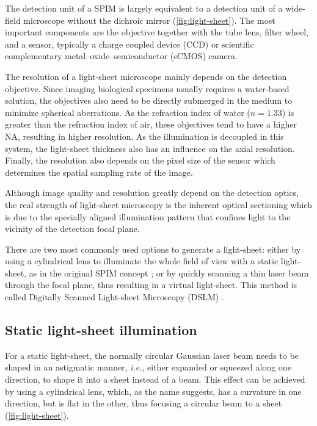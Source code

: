     The detection unit of a SPIM is largely equivalent to a detection unit of a wide-field microscope without the dichroic mirror (\autoref{fig:light-sheet}). The most important components are the objective together with the tube lens, filter wheel, and a sensor, typically a charge coupled device (CCD) or scientific complementary metal–oxide–semiconductor (sCMOS) camera.
    
    The resolution of a light-sheet microscope mainly depends on the detection objective.
    Since imaging biological specimens usually requires a water-based solution, the objectives also need to be directly submerged in the medium to minimize spherical aberrations. As the refraction index of water ($n=1.33$) is greater than the refraction index of air, these objectives tend to have a higher NA, resulting in higher resolution. As the illumination is decoupled in this system, the light-sheet thickness also has an influence on the axial resolution. Finally, the resolution also depends on the pixel size of the sensor which determines the spatial sampling rate of the image.

    Although image quality and resolution greatly depend on the detection optics, the real strength of light-sheet microscopy is the inherent optical sectioning which is due to the specially aligned illumination pattern that confines light to the vicinity of the detection focal plane.

    There are two most commonly used options to generate a light-sheet: either by using a cylindrical lens to illuminate the whole field of view with a static light-sheet, as in the original SPIM concept \cite{huisken_optical_2004}; or by quickly scanning a thin laser beam through the focal plane, thus resulting in a virtual light-sheet. This method is called Digitally Scanned Light-sheet Microscopy (DSLM) \cite{keller_reconstruction_2008}.



  \subsection{Static light-sheet illumination}
    For a static light-sheet, the normally circular Gaussian laser beam needs to be shaped in an astigmatic manner, \textit{i.e.}, either expanded or squeezed along one direction, to shape it into a sheet instead of a beam. This effect can be achieved by using a cylindrical lens, which, as the name suggests, has a curvature in one direction, but is flat in the other, thus focusing a circular beam to a sheet (\autoref{fig:light-sheet}).
    
